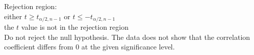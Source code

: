 \documentclass[a4paper,11pt]{article}
\begin{document}
\vspace{1cm}

Rejection region:\\
either $t \ge t_{\alpha/2,n-1}$ or $t \le - t_{\alpha/2,n-1}$ \\

the $t$ value is not in the rejection region\\

Do not reject the null hypothesis. The data does not show that the correlation coefficient differs from 0 at the 
given significance level.
\end{document}
